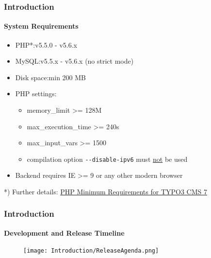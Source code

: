 \begin{frame}[fragile]
	\frametitle{Introduction}
	\framesubtitle{System Requirements}

	\begin{itemize}
		\item PHP*:\tabto{2.2cm}v5.5.0 - v5.6.x
		\item MySQL:\tabto{2.2cm}v5.5.x - v5.6.x (no strict mode)
		\item Disk space:\tabto{2.2cm}min 200 MB
		\item PHP settings:

			\begin{itemize}
				\item memory\_limit >= 128M
				\item max\_execution\_time >= 240s
				\item max\_input\_vars >= 1500
				\item compilation option \texttt{-}\texttt{-disable-ipv6} must \underline{not} be used
			\end{itemize}

		\item Backend requires IE >= 9 or any other modern browser

	\end{itemize}

	\vspace{0.8cm}

	*) Further details: \href{http://typo3.org/news/article/php-minimum-requirements-for-typo3-cms-7/}{PHP Minimum Requirements for TYPO3 CMS 7}

\end{frame}

\begin{frame}[fragile]
	\frametitle{Introduction}
	\framesubtitle{Development and Release Timeline}

	\begin{figure}
		\texttt{[image: Introduction/ReleaseAgenda.png]}
	\end{figure}

\end{frame}

